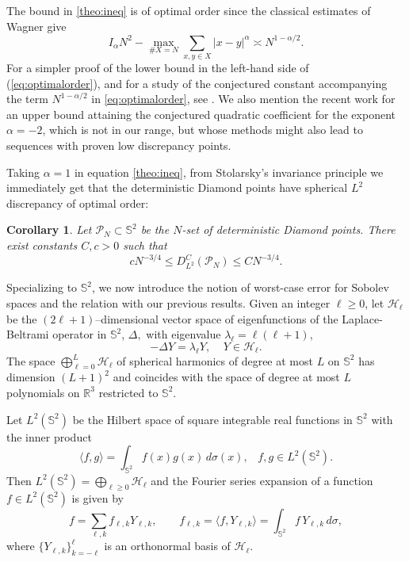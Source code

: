 \documentclass[11pt]{amsart}
\newtheorem{corollary}{Corollary}
\newcommand{\cP}{\mathcal P}
\begin{document}
The bound in \eqref{theo:ineq} is of optimal order since the classical estimates of Wagner \cite{Wag90,Wag92} give
\begin{equation}\label{eq:optimalorder}
I_\alpha N^2-\max_{\#X=N} \sum_{x,y\in X}|x-y|^\alpha \asymp N^{1-\alpha/2}.
\end{equation}
For a simpler proof of the lower bound in the left-hand side of (\ref{eq:optimalorder}), and for a study of the conjectured constant accompanying the term $N^{1-\alpha/2}$ in \eqref{eq:optimalorder}, see \cite{BHS12,BHS19}. We also mention the recent work \cite{Steinerberger2026} for an upper bound attaining the conjectured quadratic coefficient for the exponent $\alpha=-2$, which is not in our range, but whose methods might also lead to sequences with proven low discrepancy points.




Taking $\alpha=1$ in equation \eqref{theo:ineq}, from Stolarsky's invariance principle we immediately get that the deterministic Diamond points have spherical $L^2$ discrepancy of optimal order:


\begin{corollary}\label{cor:main}
Let $\cP_N\subset\mathbb S^2$ be the $N$-set of deterministic Diamond points. There exist constants
$C,c>0$ such that
$$c N^{-3/4}\le D_{L^2}^C(\mathcal P_N)\le C N^{-3/4}.$$
\end{corollary}



Specializing \cite{BSSW14} to $\mathbb S^2$, we now introduce the notion of worst-case error for Sobolev spaces and the relation with our previous results. Given an integer $\ell\ge 0$, let $\mathcal{H}_\ell$ be the $(2\ell+1)$--dimensional vector space of eigenfunctions of the Laplace-Beltrami operator in $\mathbb S^2$, $\Delta,$ with eigenvalue $\lambda_\ell=\ell (\ell+1)$,
\begin{equation*}
-\Delta Y=\lambda_\ell Y,\;\;\;\; Y\in \mathcal{H}_{\ell}.
\end{equation*}
The space $\bigoplus_{\ell=0}^L \mathcal{H}_\ell$ of spherical harmonics of degree at most
$L$ on $\mathbb{S}^2$ has dimension $(L+1)^2$ and coincides with the space of degree at most $L$ polynomials on $\mathbb R^3$ restricted to $\mathbb S^2$.


Let $L^2(\mathbb{S}^2)$ be the Hilbert space of square integrable real functions in $\mathbb{S}^2$
with the inner product
\[
\langle f,g \rangle=\int_{\mathbb{S}^2} f(x)g(x)\,d\sigma(x),\;\;\; f,g\in L^2(\mathbb{S}^2).
\]
Then $L^2(\mathbb{S}^2)=\bigoplus_{\ell\ge 0} \mathcal{H}_\ell$ and the Fourier series expansion of a function $f \in L^2(\mathbb{S}^2)$ is given by
\begin{equation*}
f=\sum_{\ell,k} f_{\ell,k} Y_{\ell,k},\qquad f_{\ell,k}=\langle f,Y_{\ell,k} \rangle=\int_{\mathbb{S}^2} f\, Y_{\ell,k} \,d\sigma,
\end{equation*}
where $\{ Y_{\ell,k} \}_{k=-\ell}^{\ell}$ is an orthonormal basis of $\mathcal{H}_\ell.$
\end{document}
